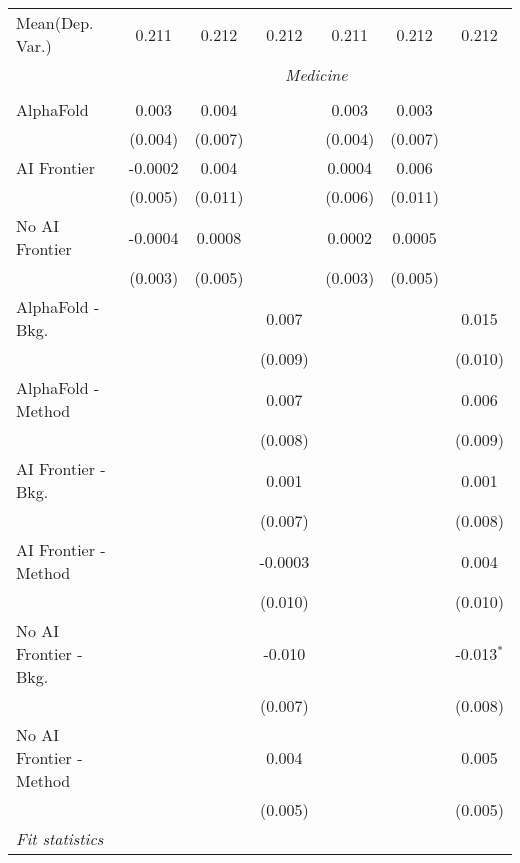 \begin{tabular}{lcccccc}
Mean(Dep. Var.) & 0.211 & 0.212 & 0.212 & 0.211 & 0.212 & 0.212 \\
 & \multicolumn{6}{c}{\textit{Medicine}} \\ \\
   AlphaFold               & 0.003   & 0.004   &         & 0.003   & 0.003   &   \\   
                           & (0.004) & (0.007) &         & (0.004) & (0.007) &   \\   
   AI Frontier             & -0.0002 & 0.004   &         & 0.0004  & 0.006   &   \\   
                           & (0.005) & (0.011) &         & (0.006) & (0.011) &   \\   
   No AI Frontier          & -0.0004 & 0.0008  &         & 0.0002  & 0.0005  &   \\   
                           & (0.003) & (0.005) &         & (0.003) & (0.005) &   \\   
   AlphaFold - Bkg.        &         &         & 0.007   &         &         & 0.015\\   
                           &         &         & (0.009) &         &         & (0.010)\\   
   AlphaFold - Method      &         &         & 0.007   &         &         & 0.006\\   
                           &         &         & (0.008) &         &         & (0.009)\\   
   AI Frontier - Bkg.      &         &         & 0.001   &         &         & 0.001\\   
                           &         &         & (0.007) &         &         & (0.008)\\   
   AI Frontier - Method    &         &         & -0.0003 &         &         & 0.004\\   
                           &         &         & (0.010) &         &         & (0.010)\\   
   No AI Frontier - Bkg.   &         &         & -0.010  &         &         & -0.013$^{*}$\\   
                           &         &         & (0.007) &         &         & (0.008)\\   
   No AI Frontier - Method &         &         & 0.004   &         &         & 0.005\\   
                           &         &         & (0.005) &         &         & (0.005)\\   
   \midrule
   \emph{Fit statistics}\\

\end{tabular}
